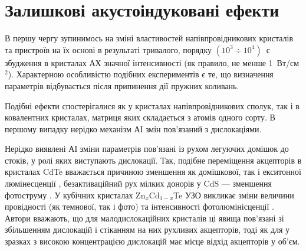 
\section{Залишкові акустоіндуковані ефекти}

В першу чергу зупинимось на зміні властивостей напівпровідникових кристалів та пристроїв на їх основі в результаті тривалого, порядку $(10^3\div10^4)$~с збудження в кристалах АХ значної інтенсивності (як правило, не менше 1~Вт/см$^2$).
Характерною особливістю подібних експериментів є те, що визначення параметрів відбувається після припинення дії пружних коливань.


Подібні ефекти спостерігалися як у кристалах напівпровідникових сполук, так і в ковалентних кристалах, матриця яких складається з атомів одного сорту.
В першому випадку нерідко механізм АІ змін пов'язаний з дислокаціями.


Нерідко виявлені АІ зміни параметрів пов'язані із рухом легуючих домішок до стоків, у ролі яких виступають дислокації.
Так, подібне переміщення акцепторів в кристалах CdTe вважається причиною зменшення як домішкової, так і екситонної люмінесценції \cite{US:CdTe},
безактиваційний рух мілких донорів у CdS --- зменшення фотоструму \cite{BorkovFTT}.
У кубічних кристалах Zn$_x$Cd$_{1-x}$Te  УЗО викликає зміни величини провідності (як темнової, так і фото) та інтенсивності фотолюмінісценції \cite{US:ZnCdTe}.
Автори вважають, що для малодислокаційних кристалів ці явища пов'язані зі збільшенням дислокацій і стіканням на них рухливих акцепторів, тоді як для у зразках з високою концентрацією дислокацій має місце відхід акцепторів у об'єм.


